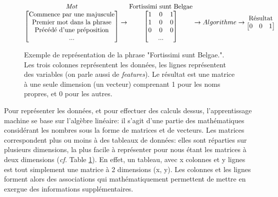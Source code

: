 \begin{figure}[h]
    \centering
    \begin{equation*}
        \begin{matrix}
            \textrm{\textit{Mot}} \\
            \begin{bmatrix}
            \textrm{Commence par une majuscule} \\
            \textrm{Premier mot dans la phrase} \\
            \textrm{Précédé d'une préposition} \\
            \textrm{...} \\
            \end{bmatrix}
        \end{matrix}
        \rightarrow
        \begin{matrix}
            \textrm{Fortissimi sunt Belgae} \\
            \begin{bmatrix}
            1 & 0 & 1 \\
            1 & 0 & 0 \\
            0 & 0 & 0 \\
            & \textrm{...} & \\
            \end{bmatrix}
        \end{matrix}
        \rightarrow Algorithme \rightarrow
        \begin{matrix}
            \textrm{Résultat} \\
            \begin{bmatrix}
            0 & 0 & 1 \\
            \end{bmatrix}
        \end{matrix}
        \end{equation*}
    \caption{Exemple de représentation de la phrase "Fortissimi sunt Belgae.". Les trois colonnes représentent les données, les lignes représentent des variables (on parle aussi de \textit{features}). Le résultat est une matrice à une seule dimension (un vecteur) comprenant 1 pour les noms propres, et 0 pour les autres.}
    \label{fig:deep-learning:matrice}
\end{figure}

Pour représenter les données, et pour effectuer des calculs dessus, l'apprentissage machine se base sur l'algèbre linéaire: il s'agit d'une partie des mathématiques considérant les nombres sous la forme de matrices et de vecteurs. Les matrices correspondent plus ou moins à des tableaux de données: elles sont réparties sur plusieurs dimensions, la plus facile à représenter pour nous étant les matrices à deux dimensions (\textit{cf.} Table \ref{fig:deep-learning:matrice}). En effet, un tableau, avec x colonnes et y lignes est tout simplement une matrice à 2 dimensions (x, y). Les colonnes et les lignes forment alors des associations qui mathématiquement permettent de mettre en exergue des informations supplémentaires.

